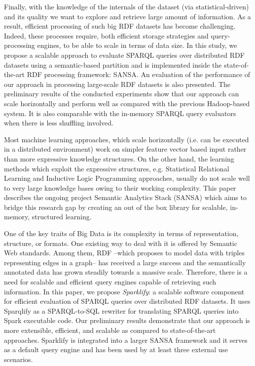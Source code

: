Finally, with the knowledge of the internals of the dataset (via statistical-driven) and its quality we want to explore and retrieve large amount of information.
As a result,  efficient processing of such big RDF datasets has become challenging.
Indeed, these processes require, both efficient storage strategies and query-processing engines, to be able to scale in terms of data size.
In this study, we propose a scalable approach to evaluate SPARQL queries over distributed RDF datasets using a semantic-based partition and is implemented inside the state-of-the-art RDF processing framework: SANSA.
An evaluation of the performance of our approach in processing large-scale RDF datasets is also presented. 
The preliminary results of the conducted experiments show that our approach can scale horizontally and perform well as compared with the previous Hadoop-based system.
It is also comparable with the in-memory SPARQL query evaluators when there is less shuffling involved.




Most machine learning approaches, which scale horizontally (i.e. can be executed in a distributed environment) work on simpler feature vector based input rather than more expressive knowledge structures. 
On the other hand, the learning methods which exploit the expressive structures, e.g. Statistical Relational Learning and Inductive Logic Programming approaches, usually do not scale well to very large knowledge bases owing to their working complexity.
This paper describes the ongoing project Semantic Analytics Stack (SANSA) which aims to bridge this research gap by creating an out of the box library for scalable, in-memory, structured learning.

One of the key traits of Big Data is its complexity in terms of representation, structure, or formats.
One existing way to deal with it is offered by Semantic Web standards.
Among them, RDF --which proposes to model data with triples representing edges in a graph-- has received a large success and the semantically annotated data has grown steadily towards a massive scale.
Therefore, there is a need for scalable and efficient query engines capable of retrieving such information.
In this paper, we propose \emph{Sparklify}: a scalable software component for efficient evaluation of SPARQL queries over distributed RDF datasets. 
It uses Sparqlify as a SPARQL-to-SQL rewriter for translating SPARQL queries into Spark executable code.
Our preliminary results demonstrate that our approach is more extensible, efficient, and scalable as compared to state-of-the-art approaches.
Sparklify is integrated into a larger SANSA framework and it serves as a default query engine and has been used by at least three external use scenarios.
